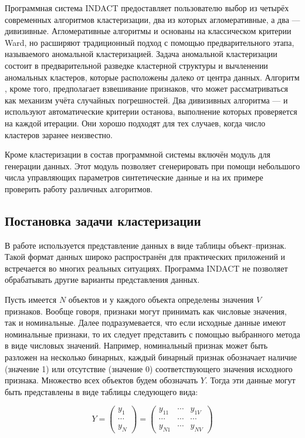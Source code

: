 \documentclass[12pt]{diploma}
\begin{document}
	Программная система INDACT предоставляет пользователю выбор из четырёх современных алгоритмов кластеризации, два из которых агломеративные, а два --- дивизивные. Агломеративные алгоритмы \AWard и \AWardpb основаны на классическом критерии Ward, но расширяют традиционный подход с помощью предварительного этапа, называемого аномальной кластеризацией. Задача аномальной кластеризации состоит в предварительной разведке кластерной структуры и вычленении аномальных кластеров, которые расположены далеко от центра данных. Алгоритм \AWardpb, кроме того, предполагает взвешивание признаков, что может рассматриваться как механизм учёта случайных погрешностей. Два дивизивных алгоритма --- \dePDDP и \BiKMR используют автоматические критерии останова, выполнение которых проверяется на каждой итерации. Они хорошо подходят для тех случаев, когда число кластеров заранее неизвестно.
	
	Кроме кластеризации в состав программной системы включён модуль для генерации данных. Этот модуль позволяет сгенерировать при помощи небольшого числа управляющих параметров синтетические данные и на их примере проверить работу различных алгоритмов.

	\subsection{Постановка задачи кластеризации}
	В  работе используется представление данных в виде таблицы объект--признак. Такой формат данных широко распространён для практических приложений и встречается во многих реальных ситуациях. Программа INDACT не позволяет обрабатывать другие варианты представления данных. 
	
	Пусть имеется $ N $ объектов и у каждого объекта определены значения $ V $ признаков. Вообще говоря, признаки могут принимать как числовые значения, так и номинальные. Далее подразумевается, что если исходные данные имеют номинальные признаки, то их следует представить с помощью выбранного метода в виде числовых значений. Например, номинальный признак может быть разложен на несколько бинарных, каждый бинарный признак обозначает наличие (значение 1) или отсутствие (значение 0) соответствующего значения исходного признака.
	Множество всех объектов будем обозначать $ Y $. Тогда эти данные могут быть представлены в виде таблицы следующего вида:
	
	\begin{equation*}
	Y= \begin{pmatrix} 
	y_{1} \\
	\cdots \\ 
	y_{N} 
	\end{pmatrix}
	= \begin{pmatrix} 
	y_{11} & \cdots  & y_{1V} \\ 
	\cdots & \cdots  & \cdots \\ 
	y_{N1} & \cdots  & y_{NV} 
	\end{pmatrix}
	\end{equation*}
	
\end{document}
